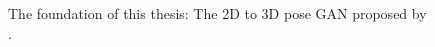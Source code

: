 \begin{figure}
	\centering
	\caption{The foundation of this thesis: The 2D to 3D pose GAN proposed by \citet{drover18}.}
	\label{fig:system}
\end{figure}